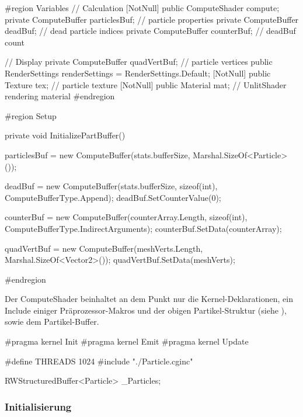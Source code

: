 \begin{csh}[caption=Controller Setup,label=lst:partSetup]
#region Variables
// Calculation
[NotNull] public ComputeShader compute;
private ComputeBuffer particlesBuf; // particle properties
private ComputeBuffer deadBuf;      // dead particle indices
private ComputeBuffer counterBuf;   // deadBuf count

// Display
private ComputeBuffer quadVertBuf;  // particle vertices
public RenderSettings renderSettings = RenderSettings.Default;
[NotNull] public Texture tex;  // particle texture
[NotNull] public Material mat; // UnlitShader rendering material
#endregion

#region Setup

private void InitializePartBuffer()
{
    particlesBuf = new ComputeBuffer(stats.bufferSize, Marshal.SizeOf<Particle>());

    deadBuf = new ComputeBuffer(stats.bufferSize, sizeof(int), ComputeBufferType.Append);
    deadBuf.SetCounterValue(0);

    counterBuf = new ComputeBuffer(counterArray.Length, sizeof(int), ComputeBufferType.IndirectArguments);
    counterBuf.SetData(counterArray);

    quadVertBuf = new ComputeBuffer(meshVerts.Length, Marshal.SizeOf<Vector2>());
    quadVertBuf.SetData(meshVerts);
}

#endregion
\end{csh}

Der ComputeShader beinhaltet an dem Punkt nur die Kernel-Deklarationen, ein Include einiger Präprozessor-Makros und der obigen Partikel-Struktur (siehe ), sowie dem Partikel-Buffer. %

\begin{hlsl}[caption=Compute Setup]
#pragma kernel Init
#pragma kernel Emit
#pragma kernel Update

#define THREADS 1024
#include "./Particle.cginc"

RWStructuredBuffer<Particle> _Particles;
\end{hlsl}

\subsubsection{Initialisierung}


